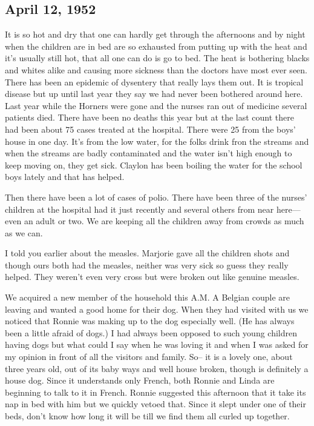 \documentclass[
]{book}
\begin{document}
\hypertarget{april-12-1952}{%
\subsection{April 12, 1952}\label{april-12-1952}}

It is so hot and dry that one can hardly get through the afternoons and by night when the children are in bed are so exhausted from putting up with the heat and it's usually still hot, that all one can do is go to bed. The heat is bothering blacks and whites alike and causing more sickness than the doctors have most ever seen. There has been an epidemic of dysentery that really lays them out. It is tropical disease but up until last year they say we had never been bothered around here. Last year while the Horners were gone and the nurses ran out of medicine several patients died. There have been no deaths this year but at the last count there had been about 75 cases treated at the hospital. There were 25 from the boys' house in one day. It's from the low water, for the folks drink fron the streams and when the streams are badly contaminated and the water isn't high enough to keep moving on, they get sick. Claylon has been boiling the water for the school boys lately and that has helped.

Then there have been a lot of cases of polio. There have been three of the nurses' children at the hospital had it just recently and several others from near here---even an adult or two. We are keeping all the children away from crowds as much as we can.

I told you earlier about the measles. Marjorie gave all the children shots and though ours both had the measles, neither was very sick so guess they really helped. They weren't even very cross but were broken out like genuine measles.

We acquired a new member of the household this A.M. A Belgian couple are leaving and wanted a good home for their dog. When they had visited with us we noticed that Ronnie was making up to the dog especially well. (He has always been a little afraid of dogs.) I had always been opposed to such young children having dogs but what could I say when he was loving it and when I was asked for my opinion in front of all the visitors and family. So-- it is a lovely one, about three years old, out of its baby ways and well house broken, though is definitely a house dog. Since it understands only French, both Ronnie and Linda are beginning to talk to it in French. Ronnie suggested this afternoon that it take its nap in bed with him but we quickly vetoed that. Since it slept under one of their beds, don't know how long it will be till we find them all curled up together.
\end{document}
